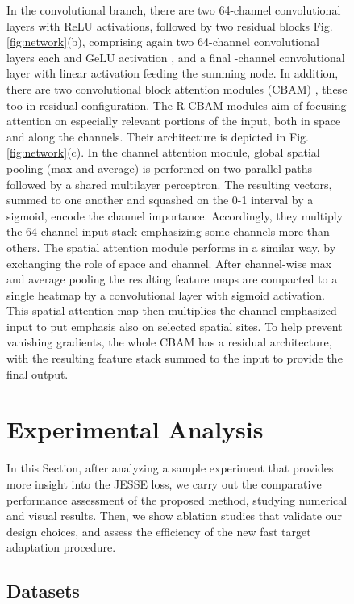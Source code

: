 \documentclass[journal]{IEEEtran}
\begin{document}
\begin{figure}
In the convolutional branch, there are two 64-channel convolutional layers with ReLU activations,
followed by two residual blocks Fig.\ref{fig:network}(b),
comprising again two 64-channel convolutional layers each and GeLU activation \cite{Hendrycks2016},
and a final -channel convolutional layer with linear activation feeding the summing node.
In addition, there are two convolutional block attention modules (CBAM) \cite{Woo2018}, these too in residual configuration.
The R-CBAM modules aim of focusing attention on especially relevant portions of the input, both in space and along the channels.
Their architecture is depicted in Fig.\ref{fig:network}(c).
In the channel attention module,
global spatial pooling (max and average) is performed on two parallel paths followed by a shared multilayer perceptron.
The resulting vectors, summed to one another and squashed on the 0-1 interval by a sigmoid,
encode the channel importance.
Accordingly, they multiply the 64-channel input stack emphasizing some channels more than others.
The spatial attention module performs in a similar way, by exchanging the role of space and channel.
After channel-wise max and average pooling
the resulting feature maps are compacted to a single heatmap by a convolutional layer with sigmoid activation.
This spatial attention map then multiplies the channel-emphasized input to put emphasis also on selected spatial sites.
To help prevent vanishing gradients, the whole CBAM has a residual architecture,
with the resulting feature stack summed to the input to provide the final output.


\section{Experimental Analysis}
\label{sec:exp}

In this Section,
after analyzing a sample experiment that provides more insight into the JESSE loss,
we carry out the comparative performance assessment of the proposed method, studying numerical and visual results.
Then, we show ablation studies that validate our design choices,
and assess the efficiency of the new fast target adaptation procedure.



\subsection{Datasets}


\end{figure}
\end{document}
